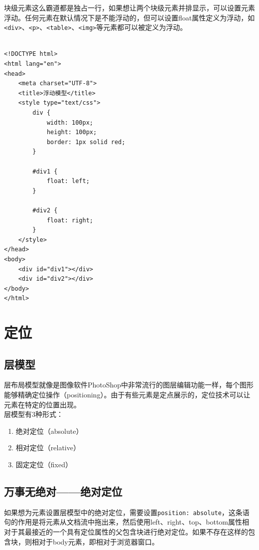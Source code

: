 块级元素这么霸道都是独占一行，如果想让两个块级元素并排显示，可以设置元素浮动。任何元素在默认情况下是不能浮动的，但可以设置float属性定义为浮动，如\lstinline|<div>|、\lstinline|<p>|、\lstinline|<table>|、\lstinline|<img>|等元素都可以被定义为浮动。 \\

 \\
\begin{lstlisting}[style=htmlcssjs]
<!DOCTYPE html>
<html lang="en">
<head>
    <meta charset="UTF-8">
    <title>浮动模型</title>
    <style type="text/css">
        div {
            width: 100px;
            height: 100px;
            border: 1px solid red;
        }

        #div1 {
            float: left;
        }

        #div2 {
            float: right;
        }
    </style>
</head>
<body>
    <div id="div1"></div>
    <div id="div2"></div>
</body>
</html>
\end{lstlisting}

\newpage

\section{定位}

\subsection{层模型}

层布局模型就像是图像软件PhotoShop中非常流行的图层编辑功能一样，每个图形能够精确定位操作（positioning）。由于有些元素是定点展示的，定位技术可以让元素在特定的位置出现。 \\

层模型有3种形式：

\begin{enumerate}
    \item 绝对定位（absolute）
    \item 相对定位（relative）
    \item 固定定位（fixed）
\end{enumerate}

\subsection{万事无绝对——绝对定位}

如果想为元素设置层模型中的绝对定位，需要设置\lstinline|position: absolute|，这条语句的作用是将元素从文档流中拖出来，然后使用left、right、top、bottom属性相对于其最接近的一个具有定位属性的父包含块进行绝对定位。如果不存在这样的包含块，则相对于body元素，即相对于浏览器窗口。 \\

